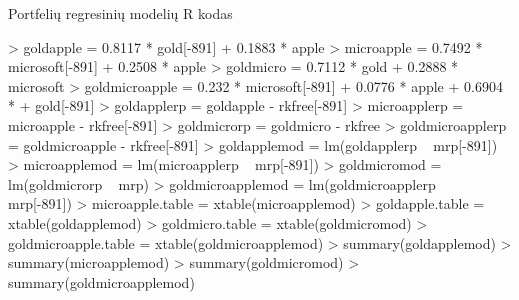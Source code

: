 \documentclass[12pt, a14paper, lithuanian]{article}
\begin{document}
 Portfelių regresinių modelių R kodas

\begin{Schunk}
\begin{Sinput}
> goldapple = 0.8117 * gold[-891] + 0.1883 * apple
> microapple = 0.7492 * microsoft[-891] + 0.2508 * apple
> goldmicro = 0.7112 * gold + 0.2888 * microsoft
> goldmicroapple = 0.232 * microsoft[-891] + 0.0776 * apple + 0.6904 * 
+     gold[-891]
> goldapplerp = goldapple - rkfree[-891]
> microapplerp = microapple - rkfree[-891]
> goldmicrorp = goldmicro - rkfree
> goldmicroapplerp = goldmicroapple - rkfree[-891]
> goldapplemod = lm(goldapplerp ~ mrp[-891])
> microapplemod = lm(microapplerp ~ mrp[-891])
> goldmicromod = lm(goldmicrorp ~ mrp)
> goldmicroapplemod = lm(goldmicroapplerp ~ mrp[-891])
> microapple.table = xtable(microapplemod)
> goldapple.table = xtable(goldapplemod)
> goldmicro.table = xtable(goldmicromod)
> goldmicroapple.table = xtable(goldmicroapplemod)
> summary(goldapplemod)
> summary(microapplemod)
> summary(goldmicromod)
> summary(goldmicroapplemod)
\end{Sinput}
\end{Schunk}
\end{document}
